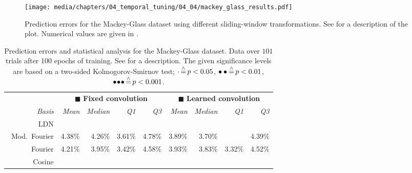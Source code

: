 \begin{figure}[p]
\centering
\texttt{[image: media/chapters/04\_temporal\_tuning/04\_04/mackey\_glass\_results.pdf]}
\caption[Prediction errors for the Mackey-Glass dataset using different sliding-window transformations]{Prediction errors for the Mackey-Glass dataset using different sliding-window transformations. See  for a description of the plot.
Numerical values are given in .}
\label{fig:mackey_glass}
\end{figure}

\begin{table}[p]
	\newcommand{\sigA}{\ensuremath{\cdot}}
	\newcommand{\sigB}{\ensuremath{\bullet\bullet}}
	\newcommand{\sigC}{\ensuremath{\bullet\!\bullet\!\bullet}}
	\caption[Prediction errors and statistical analysis for the Mackey-Glass dataset]{Prediction errors and statistical analysis for the Mackey-Glass dataset. Data over $101$ trials after $100$ epochs of training. See  for a description.
	The given significance levels are based on a two-sided Kolmogorov-Smirnov test; $\sigA \correspondsTo p < 0.05$, $\sigB \correspondsTo p < 0.01$, $\sigC \correspondsTo p < 0.001$.
	}
	\label{tbl:mackey_glass_results}
	\centering\small\sffamily
	\setlength{\tabcolsep}{8.79pt}
	\begin{tabular}{r  r r r r  r r r r}
	\toprule
	& \multicolumn{4}{c}{{\color{skyblue1}$\blacksquare$} \textbf{Fixed convolution}}
	& \multicolumn{4}{c}{{\color{aluminium2}$\blacksquare$} \textbf{Learned convolution}} \\
	\cmidrule(r){2-5}\cmidrule(l){6-9}
	\emph{Basis} &
	\emph{Mean} &
	\emph{Median} &
	\emph{Q1} &
	\emph{Q3} &
	\emph{Mean} &
	\emph{Median} &
	\emph{Q1} &
	\emph{Q3} \\
	\midrule
	\symLTI~LDN &
	 \cellcolor{CornflowerBlue!75}{3.63\%} &
	 \cellcolor{CornflowerBlue!75}{3.43\%} &
	 \cellcolor{CornflowerBlue!75}{2.98\%} &
	 \cellcolor{CornflowerBlue!75}{4.22\%} &
	 \cellcolor{CornflowerBlue!75}{3.80\%} &
	 \cellcolor{CornflowerBlue!50}{3.64\%} &
	 \cellcolor{CornflowerBlue!75}{3.09\%} &
	 \cellcolor{CornflowerBlue!25}{4.37\%} \\
	\symLTI~Mod.~Fourier &
	4.38\% &
	4.26\% &
	3.61\% &
	4.78\% &
	3.89\% &
	3.70\% &
	 \cellcolor{CornflowerBlue!50}{3.15\%} &
	4.39\% \\
	\symSDT~Fourier &
	4.21\% &
	3.95\% &
	3.42\% &
	4.58\% &
	3.93\% &
	3.83\% &
	3.32\% &
	4.52\% \\
	\symSDT~Cosine &

\end{tabular}
\end{table}
